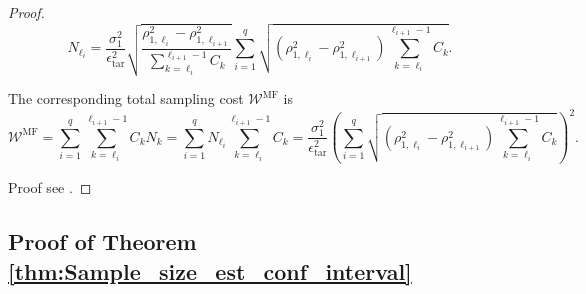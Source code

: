 \begin{proof}
\[
N_{\ell_i} = \frac{\sigma_1^2}{\epsilon_{\text{tar}}^2}\sqrt{\frac{\rho_{1,\ell_i}^2-\rho_{1,\ell_{i+1}}^2}{\sum_{k=\ell_i}^{\ell_{i+1}-1} C_{k}}}  \sum_{i=1}^{q} \sqrt{\left(\rho_{1,\ell_i}^2-\rho_{1,\ell_{i+1}}^2\right)\sum_{k=\ell_i}^{\ell_{i+1}-1} C_{k}}.
\]

The corresponding total sampling cost $\mathcal{W}^\text{MF}$ is
\[
\mathcal{W}^\text{MF} = \sum_{i=1}^q \sum_{k=\ell_i}^{\ell_{i+1}-1} C_k N_k = \sum_{i=1}^q N_{\ell_i}\sum_{k=\ell_i}^{\ell_{i+1}-1} C_k =\frac{\sigma_1^2}{\epsilon_{\text{tar}}^2}\left(\sum_{i=1}^{q} \sqrt{\left(\rho_{1,\ell_i}^2-\rho_{1,\ell_{i+1}}^2\right)\sum_{k=\ell_i}^{\ell_{i+1}-1} C_{k}}\right)^2.
\]

 Proof see \cite[Lemma~A.3]{PeWiGu:2016}.
\end{proof}
%

\subsection{Proof of Theorem \ref{thm:Sample_size_est_conf_interval} }

